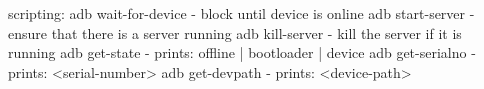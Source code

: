 scripting:
  adb wait-for-device          - block until device is online
  adb start-server             - ensure that there is a server running
  adb kill-server              - kill the server if it is running
  adb get-state                - prints: offline | bootloader | device
  adb get-serialno             - prints: <serial-number>
  adb get-devpath              - prints: <device-path>

